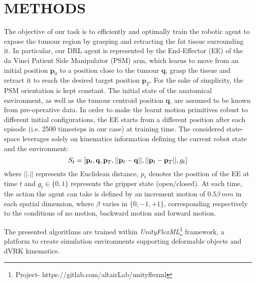 \documentclass[letterpaper, 10 pt, conference]{ieeeconf}
\begin{document}
\section{METHODS\label{sec:methods}}
The objective of our task is to efficiently and optimally train the robotic agent to expose the tumour region by grasping and retracting the fat tissue surrounding it. In particular, our DRL agent is represented by the End-Effector (EE) of the da Vinci Patient Side Manipulator (PSM) arm, which learns to move from an initial position $\mathbf{p}_0$ to a position close to the tumour $\mathbf{q}$, grasp the tissue and retract it to reach the desired target position $\mathbf{p}_T$. For the sake of simplicity, the PSM orientation is kept constant. The initial state of the anatomical environment, as well as the tumour centroid position $\mathbf{q}$, are assumed to be known from pre-operative data. 
In order to make the learnt motion primitives robust to different initial configurations, the EE starts from a different position after each episode (i.e. 2500 timesteps in our case) at training time. 
The considered state-space leverages solely on kinematics information defining the current robot state and the environment: 
\begin{equation}
S_t = [\mathbf{p}_t, \mathbf{q}, \mathbf{p}_T, ||\mathbf{p}_t-\mathbf{q}||, ||\mathbf{p}_t-\mathbf{p}_T||, g_t] \\
\end{equation}
where $|| . ||$ represents the Euclidean distance, $p_t$ denotes the position of the EE at time $t$ and $g_t \in \{0,1\}$ represents the gripper state (open/closed). 
At each time, the action the agent can take is defined by an increment motion of $0.5\beta\,mm$ in each spatial dimension, where $\beta$ varies in $\{0,-1,+1\}$, corresponding respectively to the conditions of no motion, backward motion and forward motion. 


The presented algorithms are trained within \textit{UnityFlexML}\footnote{Project- https://gitlab.com/altairLab/unityflexml} framework, a platform to create simulation environments supporting deformable objects and dVRK kinematics. 
\end{document}
